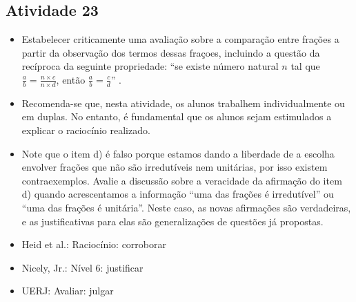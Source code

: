 \begin{multicols}{2}
\subsection{Atividade 23}

\begin{itemize} %
  \item     Estabelecer criticamente uma avaliação sobre a comparação entre
frações a partir da observação dos termos dessas fraçoes, incluindo a questão da
recíproca da seguinte propriedade:     ``se existe número natural $n$ tal que
$\frac{a}{b} = \frac{n \times c}{n \times d}$, então $\frac{a}{b} =
\frac{c}{d}$''    .
\end{itemize} %


\begin{itemize} %
  \item     Recomenda-se que, nesta atividade, os alunos trabalhem
individualmente ou em duplas. No entanto, é fundamental que os alunos sejam
estimulados a explicar o raciocínio realizado.
  \item     Note que o item d) é falso porque estamos dando a liberdade de a
escolha envolver frações que não são irredutíveis nem unitárias, por isso
existem contraexemplos. Avalie a discussão sobre a veracidade da afirmação do
item d) quando acrescentamos a informação ``uma das frações é irredutível'' ou
``uma das frações é unitária''. Neste caso, as novas afirmações são verdadeiras,
e as justificativas para elas são generalizações de questões já propostas.
\end{itemize} %

 \vspace{.1cm}

 \vspace{.1cm}

\begin{itemize} %
  \item Heid et al.: Raciocínio: corroborar
  \item Nicely, Jr.: Nível 6: justificar
  \item UERJ: Avaliar: julgar
\end{itemize}



\end{multicols}
